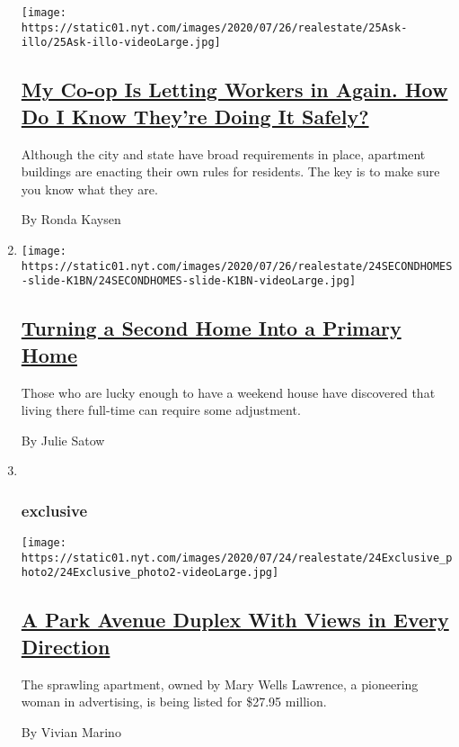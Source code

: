 \begin{enumerate}
  \texttt{[image: https://static01.nyt.com/images/2020/07/26/realestate/25Ask-illo/25Ask-illo-videoLarge.jpg]}

  \hypertarget{my-co-op-is-letting-workers-in-again-how-do-i-know-theyre-doing-it-safely}{%
  \subsection{\texorpdfstring{\href{/2020/07/25/realestate/coronavirus-reopening-workers-in-buildings-rules.html}{My
  Co-op Is Letting Workers in Again. How Do I Know They're Doing It
  Safely?}}{My Co-op Is Letting Workers in Again. How Do I Know They're Doing It Safely?}}\label{my-co-op-is-letting-workers-in-again-how-do-i-know-theyre-doing-it-safely}}

  Although the city and state have broad requirements in place,
  apartment buildings are enacting their own rules for residents. The
  key is to make sure you know what they are.

  By Ronda Kaysen
\item
  \texttt{[image: https://static01.nyt.com/images/2020/07/26/realestate/24SECONDHOMES-slide-K1BN/24SECONDHOMES-slide-K1BN-videoLarge.jpg]}

  \hypertarget{turning-a-second-home-into-a-primary-home}{%
  \subsection{\texorpdfstring{\href{/2020/07/24/realestate/coronavirus-second-homes-.html}{Turning
  a Second Home Into a Primary
  Home}}{Turning a Second Home Into a Primary Home}}\label{turning-a-second-home-into-a-primary-home}}

  Those who are lucky enough to have a weekend house have discovered
  that living there full-time can require some adjustment.

  By Julie Satow
\item ~
  \hypertarget{exclusive}{%
  \subsubsection{exclusive}\label{exclusive}}

  \texttt{[image: https://static01.nyt.com/images/2020/07/24/realestate/24Exclusive\_photo2/24Exclusive\_photo2-videoLarge.jpg]}

  \hypertarget{a-park-avenue-duplex-with-views-in-every-direction}{%
  \subsection{\texorpdfstring{\href{/2020/07/24/realestate/a-park-avenue-duplex-with-views-in-every-direction.html}{A
  Park Avenue Duplex With Views in Every
  Direction}}{A Park Avenue Duplex With Views in Every Direction}}\label{a-park-avenue-duplex-with-views-in-every-direction}}

  The sprawling apartment, owned by Mary Wells Lawrence, a pioneering
  woman in advertising, is being listed for \$27.95 million.

  By Vivian Marino
\end{enumerate}

